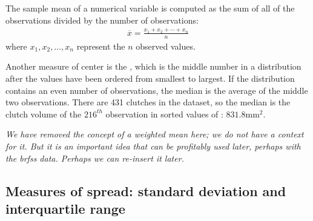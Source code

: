 \begin{doublespace}
\begin{termBox}{%
		The sample mean of a numerical variable is computed as the sum of all of the observations divided by the number of observations:
		\begin{eqnarray}
		\overline{x} = \frac{x_1+x_2+\cdots+x_n}{n}
		\label{meanEquation}
		\end{eqnarray}
		where $x_1, x_2, \dots, x_n$ represent the $n$ observed values.}
\end{termBox}\vspace{-2mm}

Another measure of center is the , which is the middle number in a distribution after the values have been ordered from smallest to largest. If the distribution contains an even number of observations, the median is the average of the middle two observations. There are 431 clutches in the dataset, so the median is the clutch volume of the $216^{th}$ observation in sorted values of : $831.8 \textrm{mm}^{2}$.

\textit{We have removed the concept of a weighted mean here; we do not have a context for it.  But it is an important idea that can be profitably used later, perhaps with the brfss data.  Perhaps we can re-insert it later.}



\subsection{Measures of spread: standard deviation and interquartile range}
\label{measuresOfSpread}


\end{doublespace}
